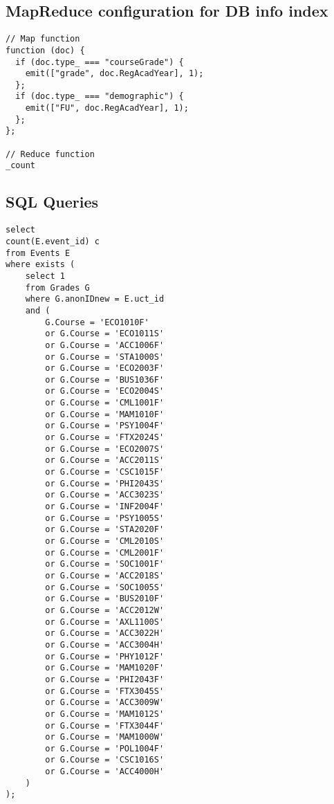 \subsection{MapReduce configuration for DB info index}
\label{appendix:dbInfo}
\begin{verbatim}
// Map function
function (doc) {
  if (doc.type_ === "courseGrade") {
    emit(["grade", doc.RegAcadYear], 1);  
  };
  if (doc.type_ === "demographic") {
    emit(["FU", doc.RegAcadYear], 1);
  };
};

// Reduce function
_count
\end{verbatim}













\subsection{SQL Queries}
\label{appendix:sql}




\begin{verbatim}
select
count(E.event_id) c 
from Events E
where exists (
    select 1
    from Grades G
    where G.anonIDnew = E.uct_id
    and (
        G.Course = 'ECO1010F'
        or G.Course = 'ECO1011S'
        or G.Course = 'ACC1006F'
        or G.Course = 'STA1000S'
        or G.Course = 'ECO2003F'
        or G.Course = 'BUS1036F'
        or G.Course = 'ECO2004S'
        or G.Course = 'CML1001F'
        or G.Course = 'MAM1010F'
        or G.Course = 'PSY1004F'
        or G.Course = 'FTX2024S'
        or G.Course = 'ECO2007S'
        or G.Course = 'ACC2011S'
        or G.Course = 'CSC1015F'
        or G.Course = 'PHI2043S'
        or G.Course = 'ACC3023S'
        or G.Course = 'INF2004F'
        or G.Course = 'PSY1005S'
        or G.Course = 'STA2020F'
        or G.Course = 'CML2010S'
        or G.Course = 'CML2001F'
        or G.Course = 'SOC1001F'
        or G.Course = 'ACC2018S'
        or G.Course = 'SOC1005S'
        or G.Course = 'BUS2010F'
        or G.Course = 'ACC2012W'
        or G.Course = 'AXL1100S'
        or G.Course = 'ACC3022H'
        or G.Course = 'ACC3004H'
        or G.Course = 'PHY1012F'
        or G.Course = 'MAM1020F'
        or G.Course = 'PHI2043F'
        or G.Course = 'FTX3045S'
        or G.Course = 'ACC3009W'
        or G.Course = 'MAM1012S'
        or G.Course = 'FTX3044F'
        or G.Course = 'MAM1000W'
        or G.Course = 'POL1004F'
        or G.Course = 'CSC1016S'
        or G.Course = 'ACC4000H'
    )
);
\end{verbatim}